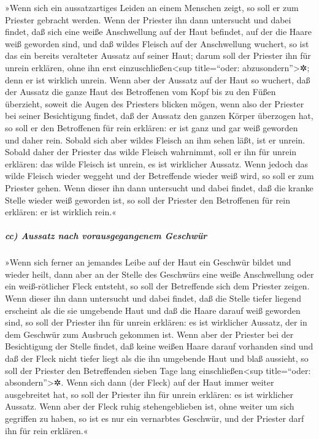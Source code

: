 »Wenn sich ein aussatzartiges Leiden an einem Menschen
zeigt, so soll er zum Priester gebracht werden. Wenn der
Priester ihn dann untersucht und dabei findet, daß sich eine weiße
Anschwellung auf der Haut befindet, auf der die Haare weiß geworden
sind, und daß wildes Fleisch auf der Anschwellung wuchert,
so ist das ein bereits veralteter Aussatz auf seiner
Haut; darum soll der Priester ihn für unrein erklären, ohne ihn erst
einzuschließen\textless sup title=``oder: abzusondern''\textgreater✲;
denn er ist wirklich unrein. Wenn aber der Aussatz auf
der Haut so wuchert, daß der Aussatz die ganze Haut des Betroffenen vom
Kopf bis zu den Füßen überzieht, soweit die Augen des Priesters blicken
mögen, wenn also der Priester bei seiner Besichtigung
findet, daß der Aussatz den ganzen Körper überzogen hat, so soll er den
Betroffenen für rein erklären: er ist ganz und gar weiß geworden und
daher rein. Sobald sich aber wildes Fleisch an ihm sehen
läßt, ist er unrein. Sobald daher der Priester das wilde
Fleisch wahrnimmt, soll er ihn für unrein erklären: das wilde Fleisch
ist unrein, es ist wirklicher Aussatz. Wenn jedoch das
wilde Fleisch wieder weggeht und der Betreffende wieder weiß wird, so
soll er zum Priester gehen. Wenn dieser ihn dann
untersucht und dabei findet, daß die kranke Stelle wieder weiß geworden
ist, so soll der Priester den Betroffenen für rein erklären: er ist
wirklich rein.«

\hypertarget{cc-aussatz-nach-vorausgegangenem-geschwuxfcr}{%
\subparagraph{cc) Aussatz nach vorausgegangenem
Geschwür}\label{cc-aussatz-nach-vorausgegangenem-geschwuxfcr}}

»Wenn sich ferner an jemandes Leibe auf der Haut ein
Geschwür bildet und wieder heilt, dann aber an der Stelle
des Geschwürs eine weiße Anschwellung oder ein weiß-rötlicher Fleck
entsteht, so soll der Betreffende sich dem Priester zeigen.
Wenn dieser ihn dann untersucht und dabei findet, daß die
Stelle tiefer liegend erscheint als die sie umgebende Haut und daß die
Haare darauf weiß geworden sind, so soll der Priester ihn für unrein
erklären: es ist wirklicher Aussatz, der in dem Geschwür zum Ausbruch
gekommen ist. Wenn aber der Priester bei der Besichtigung
der Stelle findet, daß keine weißen Haare darauf vorhanden sind und daß
der Fleck nicht tiefer liegt als die ihn umgebende Haut und blaß
aussieht, so soll der Priester den Betreffenden sieben Tage lang
einschließen\textless sup title=``oder: absondern''\textgreater✲.
Wenn sich dann (der Fleck) auf der Haut immer weiter
ausgebreitet hat, so soll der Priester ihn für unrein erklären: es ist
wirklicher Aussatz. Wenn aber der Fleck ruhig
stehengeblieben ist, ohne weiter um sich gegriffen zu haben, so ist es
nur ein vernarbtes Geschwür, und der Priester darf ihn für rein
erklären.«

